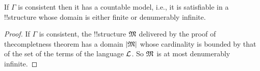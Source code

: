 \documentclass[../../include/open-logic-section]{subfiles}
\begin{document}

\begin{thm} 
If $\Gamma$ is consistent then it has a countable model, i.e., it is
satisfiable in a !!{structure} whose domain is either finite or
denumerably infinite.
\end{thm}

\begin{proof}
  If $\Gamma$ is consistent, the !!{structure} $\mathfrak M$ delivered by
  the proof of thecompletness theorem has a domain $\left| \mathfrak M \right|$ whose
  cardinality is bounded by that of the set of the terms of the
  language $\mathcal L$. So $\mathfrak M$ is at most denumerably infinite.
\end{proof}
\end{document}
